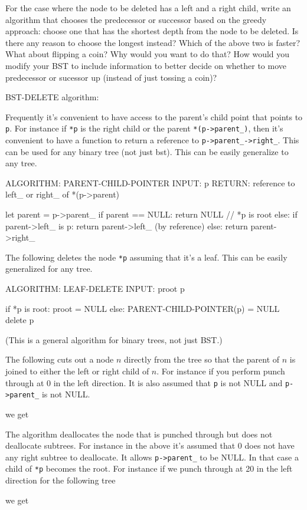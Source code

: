 \begin{ex}
  \begin{tightlist}
    \li For the case where the node to be deleted has a left and a right child,
    write an algorithm that chooses the predecessor or successor based
    on the greedy approach: choose one that has the shortest depth from the
    node to be deleted.
    \li Is there any reason to choose the longest instead?
    \li Which of the above two is faster?
    \li What about flipping a coin? Why would you want to do that?
    \li How would you modify your BST to include information
    to better decide 
    on whether to move predecessor or sucessor up (instead of just
    tossing a coin)?
  \end{tightlist}
\end{ex}

\newpage
BST-DELETE algorithm:

Frequently it's convenient to have access to the parent's child point
that points to \verb!p!.
For instance if \verb!*p! is the right child or the parent
\verb!*(p->parent_)!, then it's convenient to have a function
to return a reference to \verb!p->parent_->right_!.
This can be used for any binary tree (not just bst).
This can be easily generalize to any tree.
\begin{console}
ALGORITHM: PARENT-CHILD-POINTER
INPUT:  p
RETURN: reference to left_ or right_ of *(p->parent)

let parent = p->parent_
if parent == NULL:
    return NULL // *p is root
else:
    if parent->left_ is p:
        return parent->left_ (by reference)
    else:
        return parent->right_
\end{console}

The following deletes the node \verb!*p! assuming that it's a leaf.
This can be easily generalized for any tree.
\begin{console}
ALGORITHM: LEAF-DELETE
INPUT: proot
       p

if *p is root:
    proot = NULL
else:
    PARENT-CHILD-POINTER(p) = NULL
delete p
\end{console}
(This is a general algorithm for binary trees, not just BST.)

The following cuts out a node $n$
directly from the tree so that the parent of $n$ is joined to
either the left or right child of $n$.
For instance if you perform punch through at 0 in the left direction.
It is also assumed that \verb!p! is not NULL and
\verb!p->parent_! is not NULL.

we get

The algorithm deallocates the node that is punched through
but does not deallocate subtrees. For instance in the above
it's assumed that 0 does not have any right subtree to deallocate.
It allows \verb!p->parent_! to be NULL. In that case
a child of \verb!*p! becomes the root.
For instance if we punch through at 20 in the left direction for
the following tree

we get


